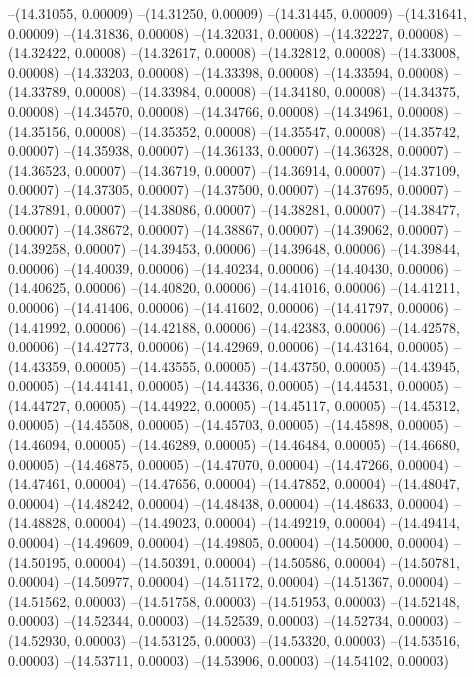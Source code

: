 --(14.31055, 0.00009)
--(14.31250, 0.00009)
--(14.31445, 0.00009)
--(14.31641, 0.00009)
--(14.31836, 0.00008)
--(14.32031, 0.00008)
--(14.32227, 0.00008)
--(14.32422, 0.00008)
--(14.32617, 0.00008)
--(14.32812, 0.00008)
--(14.33008, 0.00008)
--(14.33203, 0.00008)
--(14.33398, 0.00008)
--(14.33594, 0.00008)
--(14.33789, 0.00008)
--(14.33984, 0.00008)
--(14.34180, 0.00008)
--(14.34375, 0.00008)
--(14.34570, 0.00008)
--(14.34766, 0.00008)
--(14.34961, 0.00008)
--(14.35156, 0.00008)
--(14.35352, 0.00008)
--(14.35547, 0.00008)
--(14.35742, 0.00007)
--(14.35938, 0.00007)
--(14.36133, 0.00007)
--(14.36328, 0.00007)
--(14.36523, 0.00007)
--(14.36719, 0.00007)
--(14.36914, 0.00007)
--(14.37109, 0.00007)
--(14.37305, 0.00007)
--(14.37500, 0.00007)
--(14.37695, 0.00007)
--(14.37891, 0.00007)
--(14.38086, 0.00007)
--(14.38281, 0.00007)
--(14.38477, 0.00007)
--(14.38672, 0.00007)
--(14.38867, 0.00007)
--(14.39062, 0.00007)
--(14.39258, 0.00007)
--(14.39453, 0.00006)
--(14.39648, 0.00006)
--(14.39844, 0.00006)
--(14.40039, 0.00006)
--(14.40234, 0.00006)
--(14.40430, 0.00006)
--(14.40625, 0.00006)
--(14.40820, 0.00006)
--(14.41016, 0.00006)
--(14.41211, 0.00006)
--(14.41406, 0.00006)
--(14.41602, 0.00006)
--(14.41797, 0.00006)
--(14.41992, 0.00006)
--(14.42188, 0.00006)
--(14.42383, 0.00006)
--(14.42578, 0.00006)
--(14.42773, 0.00006)
--(14.42969, 0.00006)
--(14.43164, 0.00005)
--(14.43359, 0.00005)
--(14.43555, 0.00005)
--(14.43750, 0.00005)
--(14.43945, 0.00005)
--(14.44141, 0.00005)
--(14.44336, 0.00005)
--(14.44531, 0.00005)
--(14.44727, 0.00005)
--(14.44922, 0.00005)
--(14.45117, 0.00005)
--(14.45312, 0.00005)
--(14.45508, 0.00005)
--(14.45703, 0.00005)
--(14.45898, 0.00005)
--(14.46094, 0.00005)
--(14.46289, 0.00005)
--(14.46484, 0.00005)
--(14.46680, 0.00005)
--(14.46875, 0.00005)
--(14.47070, 0.00004)
--(14.47266, 0.00004)
--(14.47461, 0.00004)
--(14.47656, 0.00004)
--(14.47852, 0.00004)
--(14.48047, 0.00004)
--(14.48242, 0.00004)
--(14.48438, 0.00004)
--(14.48633, 0.00004)
--(14.48828, 0.00004)
--(14.49023, 0.00004)
--(14.49219, 0.00004)
--(14.49414, 0.00004)
--(14.49609, 0.00004)
--(14.49805, 0.00004)
--(14.50000, 0.00004)
--(14.50195, 0.00004)
--(14.50391, 0.00004)
--(14.50586, 0.00004)
--(14.50781, 0.00004)
--(14.50977, 0.00004)
--(14.51172, 0.00004)
--(14.51367, 0.00004)
--(14.51562, 0.00003)
--(14.51758, 0.00003)
--(14.51953, 0.00003)
--(14.52148, 0.00003)
--(14.52344, 0.00003)
--(14.52539, 0.00003)
--(14.52734, 0.00003)
--(14.52930, 0.00003)
--(14.53125, 0.00003)
--(14.53320, 0.00003)
--(14.53516, 0.00003)
--(14.53711, 0.00003)
--(14.53906, 0.00003)
--(14.54102, 0.00003)
